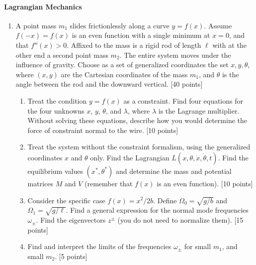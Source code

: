 \documentclass[letterpaper,11pt]{article}
\begin{document}
\paragraph*{Lagrangian Mechanics}
\begin{enumerate}
 \item A point mass $m_1$ slides frictionlessly along a curve $y = f(x)$.  Assume $f(-x) = f(x)$ is an even function with a single minimum at $x = 0$, and that $f''(x) > 0$.  Affixed to the mass is a rigid rod of length $\ell$ with at the other end a second point mass $m_2$.  The entire system moves under the influence of gravity.  Choose as a set of generalized coordinates the set ${x,y,\theta}$, where $(x,y)$ are the Cartesian coordinates of the mass $m_1$, and $\theta$ is the angle between the rod and the downward vertical. [40 points]
 \begin{enumerate}
  \item Treat the condition $y = f(x)$ as a constraint.  Find four equations for the four unknowns $x$, $y$, $\theta$, and $\lambda$, where $\lambda$ is the Lagrange multiplier.  Without solving these equations, describe how you would determine the force of constraint normal to the wire. [10 points]
  \item Treat the system without the constraint formalism, using the generalized coordinates $x$ and $\theta$ only.  Find the Lagrangian $L(x,\theta,\dot{x},\dot{\theta},t)$.  Find the equilibrium values $(x^*,\theta^*)$ and determine the mass and potential matrices $M$ and $V$ (remember that $f(x)$ is an even function). [10 points]
  \item Consider the specific case $f(x) = x^2/2b$.  Define $\Omega_0 = \sqrt{g/b}$ and $\Omega_1 = \sqrt{g/\ell}$.  Find a general expression for the normal mode frequencies $\omega_\pm$.  Find the eigenvectors $z^\pm$ (you do not need to normalize them). [15 points]
  \item Find and interpret the limits of the frequencies $\omega_\pm$ for small $m_1$, and small $m_2$. [5 points]
  \begin{center}
  \end{center}
 \end{enumerate}
\end{enumerate}
\end{document}
